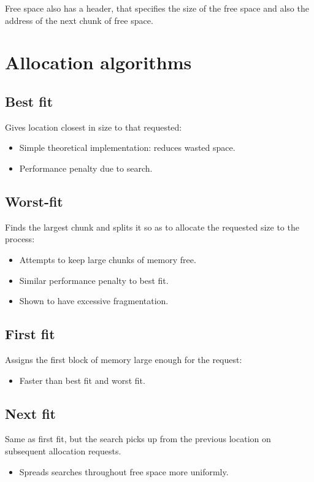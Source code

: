 Free space also has a header, that specifies the size of the free space and also the address of the next chunk of free space.

\section{Allocation algorithms}

\subsection{Best fit}
\label{sec:best-fit}

Gives location closest in size to that requested:
\begin{itemize}
\item Simple theoretical implementation: reduces wasted space.
\item Performance penalty due to search.
\end{itemize}


\subsection{Worst-fit}
\label{sec:worst-fit}

Finds the largest chunk and splits it so as to allocate the requested size to the process:
\begin{itemize}
\item Attempts to keep large chunks of memory free.
\item Similar performance penalty to best fit.
\item Shown to have excessive fragmentation.
\end{itemize}


\subsection{First fit}
\label{sec:first-fit}
 
Assigns the first block of memory large enough for the request:
\begin{itemize}
\item Faster than best fit and worst fit.
\end{itemize}

\subsection{Next fit}
\label{sec:next-fit}

Same as first fit, but the search picks up from the previous location on subsequent allocation requests.
\begin{itemize}
\item Spreads searches throughout free space more uniformly.
\end{itemize}

